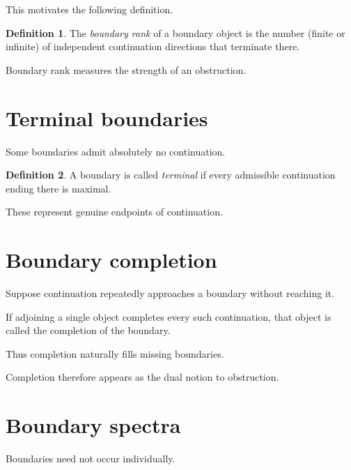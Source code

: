 \documentclass[13pt,openany]{book}
\theoremstyle{plain}
\theoremstyle{definition}
\newtheorem{definition}{Definition}[chapter]
\begin{document}
This motivates the following definition.

\begin{definition}
The \emph{boundary rank} of a boundary object is the number (finite or infinite) of independent continuation directions that terminate there.
\end{definition}

Boundary rank measures the strength of an obstruction.

\section{Terminal boundaries}

Some boundaries admit absolutely no continuation.

\begin{definition}
A boundary is called \emph{terminal} if every admissible continuation ending there is maximal.
\end{definition}

These represent genuine endpoints of continuation.

\section{Boundary completion}

Suppose continuation repeatedly approaches a boundary without reaching it.

If adjoining a single object completes every such continuation, that object is called the completion of the boundary.

Thus completion naturally fills missing boundaries.

Completion therefore appears as the dual notion to obstruction.

\section{Boundary spectra}

Boundaries need not occur individually.
\end{document}
